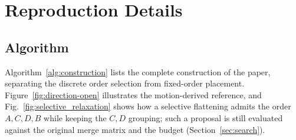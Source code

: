 \documentclass[preprint]{vgtc}   %
\begin{document}
\begin{algorithm}[tp]
\caption{Optimal Merge Barriers for a Fixed Leaf Order}\label{alg:barriers}
\end{algorithm}

\FloatBarrier
\section{Reproduction Details}\label{sec:construction}
\subsection{Algorithm}\label{sec:supp_construction}
Algorithm~\ref{alg:construction} lists the complete construction of the paper, separating the discrete order selection from fixed-order placement. Figure~\ref{fig:direction-open} illustrates the motion-derived reference, and Fig.~\ref{fig:selective_relaxation} shows how a selective flattening admits the order $A,C,D,B$ while keeping the $C,D$ grouping; such a proposal is still evaluated against the original merge matrix and the budget (Section~\ref{sec:search}).
\end{document}
